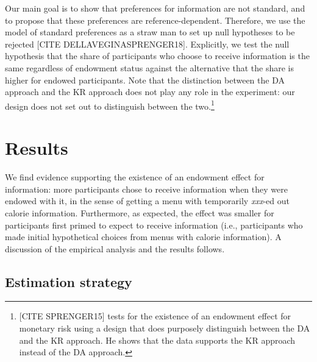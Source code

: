 \documentclass[12pt]{article}
\begin{document}
Our main goal is to show that preferences for information are not standard, and to propose that these preferences are reference-dependent. Therefore, we use the model of standard preferences as a straw man to set up null hypotheses to be rejected [CITE DELLAVEGINASPRENGER18]. Explicitly, we test the null hypothesis that the share of participants who choose to receive information is the same regardless of endowment status against the alternative that the share is higher for endowed participants. Note that the distinction between the DA approach and the KR approach does not play any role in the experiment: our design does not set out to distinguish between the two.\footnote{[CITE SPRENGER15] tests for the existence of an endowment effect for monetary risk using a design that does purposely distinguish between the DA and the KR approach. He shows that the data supports the KR approach instead of the DA approach.}

\section{Results}

We find evidence supporting the existence of an endowment effect for information: more participants chose to receive information when they were endowed with it, in the sense of getting a menu with temporarily \emph{xxx}-ed out calorie information. Furthermore, as expected, the effect was smaller for participants first primed to expect to receive information (i.e., participants who made initial hypothetical choices from menus with calorie information). A discussion of the empirical analysis and the results follows.

\subsection{Estimation strategy}
\end{document}
